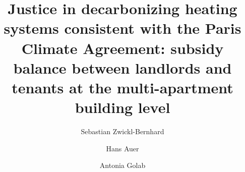 \documentclass[review]{elsarticle}
\begin{document}
\begin{frontmatter}

\title{Justice in decarbonizing heating systems consistent with the Paris Climate Agreement: subsidy balance between landlords and tenants at the multi-apartment building level}
\author[1]{Sebastian Zwickl-Bernhard}
\author[1]{Hans Auer}
\author[1]{Antonia Golab}
\address[1]{Energy Economics Group (EEG), Technische Universität Wien, Gusshausstrasse 25-29/E370-3, 1040 Wien, Austria}

\begin{abstract}

\end{abstract}

\begin{keyword}
	
\end{keyword}
\end{frontmatter}

\newpage
\end{document}
